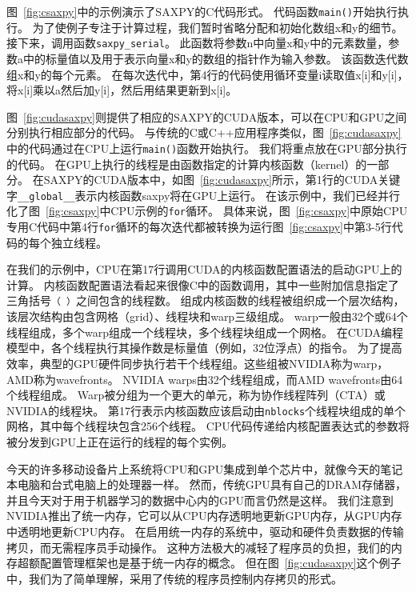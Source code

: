 图~\ref{fig:csaxpy}中的示例演示了SAXPY的C代码形式。
代码函数\texttt{main()}开始执行执行。 为了使例子专注于计算过程，我们暂时省略分配和初始化数组x和y的细节。 
接下来，调用函数\texttt{saxpy\_serial}。 
此函数将参数n中向量x和y中的元素数量，参数a中的标量值以及用于表示向量x和y的数组的指针作为输入参数。 
该函数迭代数组x和y的每个元素。 
在每次迭代中，第4行的代码使用循环变量i读取值x[i]和y[i]，将x[i]乘以a然后加y[i]，然后用结果更新到x[i]。
 
图~\ref{fig:cudasaxpy}则提供了相应的SAXPY的CUDA版本，可以在CPU和GPU之间分别执行相应部分的代码。
与传统的C或C++应用程序类似，图~\ref{fig:cudasaxpy}中的代码通过在CPU上运行\texttt{main()}函数开始执行。 
我们将重点放在GPU部分执行的代码。
在GPU上执行的线程是由函数指定的计算内核函数（kernel）的一部分。 
在SAXPY的CUDA版本中，如图~\ref{fig:cudasaxpy}所示，第1行的CUDA关键字\texttt{\_\_global\_\_}表示内核函数saxpy将在GPU上运行。 
在该示例中，我们已经并行化了图~\ref{fig:csaxpy}中CPU示例的\texttt{for}循环。 
具体来说，图~\ref{fig:csaxpy}中原始CPU专用C代码中第4行\texttt{for}循环的每次迭代都被转换为运行图~\ref{fig:csaxpy}中第3-5行代码的每个独立线程。

在我们的示例中，CPU在第17行调用CUDA的内核函数配置语法的启动GPU上的计算。
内核函数配置语法看起来很像C中的函数调用，其中一些附加信息指定了三角括号\texttt{（\<\<\< \>\>\>）}之间包含的线程数。
组成内核函数的线程被组织成一个层次结构，该层次结构由包含网格（grid）、线程块和warp三级组成。
warp一般由32个或64个线程组成，多个warp组成一个线程块，多个线程块组成一个网格。
在CUDA编程模型中，各个线程执行其操作数是标量值（例如，32位浮点）的指令。
为了提高效率，典型的GPU硬件同步执行若干个线程组。这些组被NVIDIA称为warp，AMD称为wavefronts。 NVIDIA warps由32个线程组成，而AMD wavefronts由64个线程组成。 
Warp被分组为一个更大的单元，称为协作线程阵列（CTA）或NVIDIA的线程块。
第17行表示内核函数应该启动由\texttt{nblocks}个线程块组成的单个网格，其中每个线程块包含256个线程。
CPU代码传递给内核配置表达式的参数将被分发到GPU上正在运行的线程的每个实例。

今天的许多移动设备片上系统将CPU和GPU集成到单个芯片中，就像今天的笔记本电脑和台式电脑上的处理器一样。 
然而，传统GPU具有自己的DRAM存储器，并且今天对于用于机器学习的数据中心内的GPU而言仍然是这样。 
我们注意到NVIDIA推出了统一内存，它可以从CPU内存透明地更新GPU内存，从GPU内存中透明地更新CPU内存。 
在启用统一内存的系统中，驱动和硬件负责数据的传输拷贝，而无需程序员手动操作。
这种方法极大的减轻了程序员的负担，我们的内存超额配置管理框架也是基于统一内存的概念。
但在图~\ref{fig:cudasaxpy}这个例子中，我们为了简单理解，采用了传统的程序员控制内存拷贝的形式。

